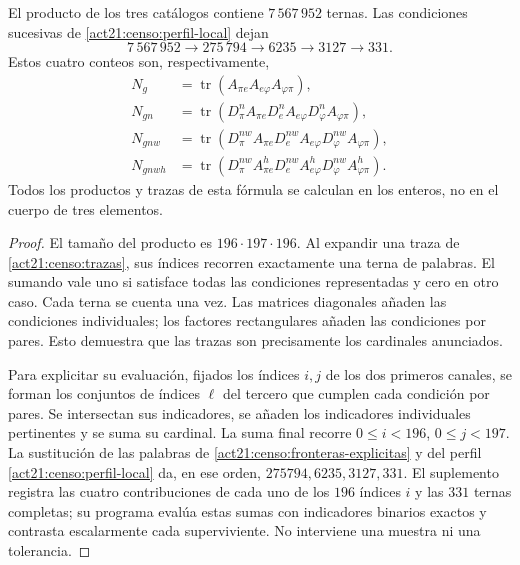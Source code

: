 \begin{samepage}
\begin{theorem}
\label{act21:censo:teorema-conteo}
El producto de los tres catálogos contiene \(7\,567\,952\) ternas.
Las condiciones sucesivas de \eqref{act21:censo:perfil-local} dejan
\begin{equation}
 7\,567\,952\longrightarrow275\,794\longrightarrow6235
 \longrightarrow3127\longrightarrow331.
 \label{act21:censo:cadena-local}
\end{equation}
Estos cuatro conteos son, respectivamente,
\begin{align}
 N_g&=\operatorname{tr}(A_{\pi e}A_{e\varphi}A_{\varphi\pi}),
 \nonumber\\
 N_{gn}&=\operatorname{tr}(D_\pi^n A_{\pi e}
             D_e^n A_{e\varphi}D_\varphi^n A_{\varphi\pi}),
 \nonumber\\
 N_{gnw}&=\operatorname{tr}(D_\pi^{nw} A_{\pi e}
             D_e^{nw} A_{e\varphi}D_\varphi^{nw} A_{\varphi\pi}),
 \nonumber\\
 N_{gnwh}&=\operatorname{tr}(D_\pi^{nw} A^h_{\pi e}
             D_e^{nw} A^h_{e\varphi}D_\varphi^{nw} A^h_{\varphi\pi}).
 \label{act21:censo:trazas}
\end{align}
Todos los productos y trazas de esta fórmula se calculan en los enteros,
no en el cuerpo de tres elementos.
\end{theorem}
\end{samepage}
\begin{proof}
El tamaño del producto es \(196\cdot197\cdot196\). Al expandir
una traza de \eqref{act21:censo:trazas}, sus índices recorren exactamente una
terna de palabras. El sumando vale uno si satisface todas las condiciones
representadas y cero en otro caso. Cada terna se cuenta una vez.
Las matrices diagonales añaden las condiciones individuales; los factores
rectangulares añaden las condiciones por pares. Esto demuestra que las
trazas son precisamente los cardinales anunciados.

Para explicitar su evaluación, fijados los índices \(i,j\) de los dos
primeros canales, se forman los conjuntos de índices \(\ell\) del tercero
que cumplen cada condición por pares. Se intersectan sus indicadores,
se añaden los indicadores individuales pertinentes y se suma su cardinal.
La suma final recorre \(0\leq i<196\), \(0\leq j<197\).
La sustitución de las palabras de \eqref{act21:censo:fronteras-explicitas} y
del perfil \eqref{act21:censo:perfil-local} da, en ese orden,
\(275794,6235,3127,331\). El suplemento registra las cuatro contribuciones
de cada uno de los \(196\) índices \(i\) y las \(331\) ternas completas;
su programa evalúa estas sumas con indicadores binarios exactos y contrasta
escalarmente cada superviviente. No interviene una muestra ni una tolerancia.
\end{proof}

